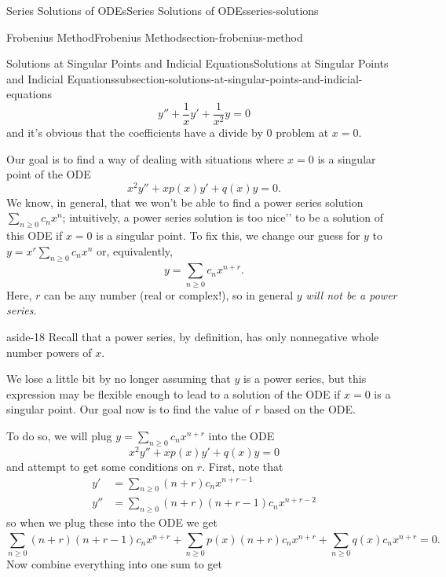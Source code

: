 \documentclass[oneside,10pt,]{book}
\numberwithin{equation}{section}
\newcommand{\amp}{&}
\begin{document}
\begin{chapterptx}{Series Solutions of ODEs}{}{Series Solutions of ODEs}{}{}{series-solutions}
\begin{sectionptx}{Frobenius Method}{}{Frobenius Method}{}{}{section-frobenius-method}
\begin{subsectionptx}{Solutions at Singular Points and Indicial Equations}{}{Solutions at Singular Points and Indicial Equations}{}{}{subsection-solutions-at-singular-points-and-indicial-equations}
\begin{equation*}
y''+\frac{1}{x}y'+\frac{1}{x^{2}}y = 0
\end{equation*}
and it's obvious that the coefficients have a divide by \(0\) problem at \(x=0\).%
\par
\hypertarget{p-473}{}%
Our goal is to find a way of dealing with situations where \(x=0\) is a singular point of the ODE%
\begin{equation*}
x^{2}y''+xp(x)y'+q(x)y=0.
\end{equation*}
We know, in general, that we won't be able to find a power series solution \(\sum_{n\geq0}^{}c_{n}x^{n}\); intuitively, a power series solution is too \textasciigrave{}\textasciigrave{}nice'{}'{} to be a solution of this ODE if \(x=0\) is a singular point. To fix this, we change our guess for \(y\) to \(y=x^{r}\sum_{n\geq0}^{}c_{n}x^{n}\) or, equivalently,%
\begin{equation*}
y = \sum_{n\geq0}^{}c_{n}x^{n+r}.
\end{equation*}
Here, \(r\) can be any number (real or complex!), so in general \(y\) \emph{will not be a power series}. \begin{aside}{}{aside-18}%
\hypertarget{p-474}{}%
Recall that a power series, by definition, has only nonnegative whole number powers of \(x\).%
\end{aside}
 We lose a little bit by no longer assuming that \(y\) is a power series, but this expression may be flexible enough to lead to a solution of the ODE if \(x=0\) is a singular point. Our goal now is to find the value of \(r\) based on the ODE.%
\par
\hypertarget{p-475}{}%
To do so, we will plug \(y=\sum_{n\geq0}^{}c_{n}x^{n+r}\) into the ODE%
\begin{equation*}
x^{2}y''+xp(x)y'+q(x)y = 0
\end{equation*}
and attempt to get some conditions on \(r\). First, note that%
\begin{align*}
y' \amp= \sum_{n\geq0}^{}(n+r)c_{n}x^{n+r-1}\\
y'' \amp= \sum_{n\geq0}^{}(n+r)(n+r-1)c_{n}x^{n+r-2}
\end{align*}
so when we plug these into the ODE we get%
\begin{equation*}
\sum_{n\geq0}^{}(n+r)(n+r-1)c_{n}x^{n+r}+\sum_{n\geq0}^{}p(x)(n+r)c_{n}x^{n+r}+\sum_{n\geq0}^{}q(x)c_{n}x^{n+r} = 0.
\end{equation*}
Now combine everything into one sum to get%
\begin{equation*}

\end{equation*}
\end{subsectionptx}
\end{sectionptx}
\end{chapterptx}
\end{document}
